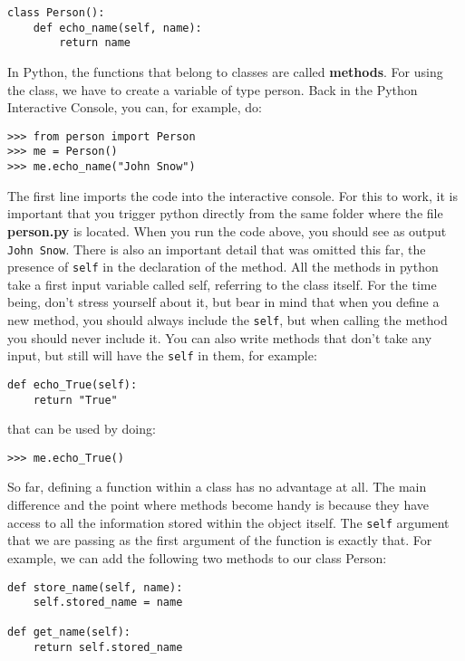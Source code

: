 \begin{verbatim}
class Person():
    def echo_name(self, name):
        return name
\end{verbatim}

In Python, the functions that belong to classes are called \textbf{methods}. For
using the class, we have to create a variable of type person. Back in the Python Interactive Console, you can, for example, do:

\begin{verbatim}
>>> from person import Person
>>> me = Person()
>>> me.echo_name("John Snow")
\end{verbatim}

The first line imports the code into the interactive console. For this to work, it is important that you trigger python directly from the same folder where the file \textbf{person.py} is located. When you run the code above, you should see as output \texttt{John Snow}. There is also an
important detail that was omitted this far, the presence of
\texttt{self} in the declaration of the method. All the methods in
python take a first input variable called self, referring to the class
itself. For the time being, don't stress yourself about it, but bear in
mind that when you define a new method, you should always include the
\texttt{self}, but when calling the method you should never include it.
You can also write methods that don't take any input, but still will
have the \texttt{self} in them, for example:

\begin{verbatim}
def echo_True(self):
    return "True"
\end{verbatim}

that can be used by doing:

\begin{verbatim}
>>> me.echo_True()
\end{verbatim}

So far, defining a function within a class has no advantage at all. The main difference and the point where methods become handy is because
they have access to all the information stored within the object itself.
The \texttt{self} argument that we are passing as the first argument of the
function is exactly that. For example, we can add the following two
methods to our class Person:

\begin{verbatim}
def store_name(self, name):
    self.stored_name = name

def get_name(self):
    return self.stored_name
\end{verbatim}

